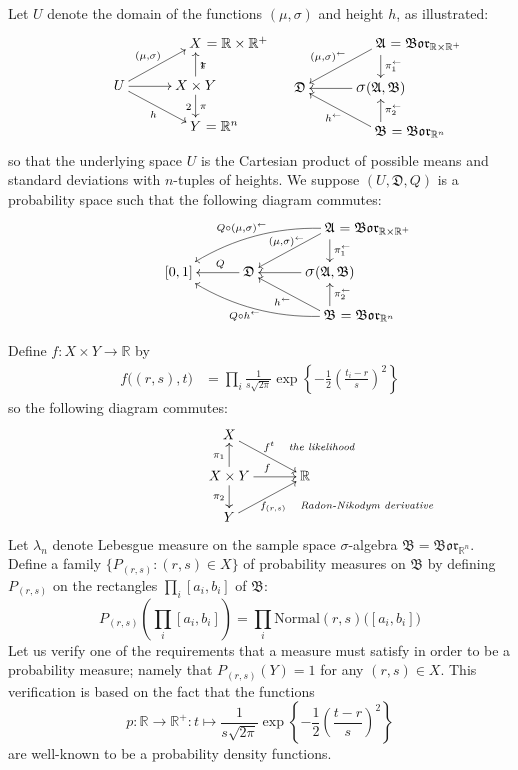\documentclass[
twoside=true,
paper=letter,
fontsize=9pt,
pagesize=auto,
leqno,
openany,
headsepline,
overfullrule,
]{scrbook}
\theoremstyle{plain}
\theoremstyle{plain}
\theoremstyle{definition}
\theoremstyle{bfnoteitalic}
\theoremstyle{bfnoteroman}
\newcommand{\sigalg}[1]{\mathfrak{#1}}
\newcommand{\borel}{\mathfrak{Bor}}
\newcommand{\sagb}{\mathop{\hbox{\large{$\sigma$}}}\nolimits}
\newcommand{\textsigma}{\hbox{\large{$\sigma$}}\kern-1pt}
\newcommand{\preimage}[1]{\mathop{#1^{\leftarrow}}}
\newcommand{\R}{\mathbb{R}}
\newcommand{\productsig}[2]{\sagb(#1,#2)}
\newcommand{\function}{f}
\newcommand{\measurespace}{X}
\newcommand{\measurespaceii}{Y}
\newcommand{\measureiii}{\lambda}
\newcommand{\projectionone}{\pi_1}
\newcommand{\projectiontwo}{\pi_2}
\newcommand{\pspace}{\measurespace}%
\newcommand{\sspace}{\measurespaceii}%
\newcommand{\sspacesig}{\sigalg{B}}
\newcommand{\pspacesig}{\sigalg{A}}
\begin{document}
Let $U$ denote the domain of the functions $(\mu,\sigma)$ and height $h$, as illustrated:
\[
\xymatrix@R=16pt@C=30pt{ 
 & \pspace \rlap{ $=\R\times\R^+$}
 \\
 U \ar[ur]^{(\mu,\sigma)} \ar[dr]_h \ar[r] & 
 \pspace\times\sspace \ar[u]_\projectionone \ar[d]^\projectiontwo
 \\
  & \sspace\rlap{ $=\R^n$} \\
}
%
\hspace{50pt}
%
\xymatrix@R=16pt@C=30pt{ 
 & \pspacesig \rlap{ $=\borel_{\R\times\R^+}$}
 \ar[dl]_{\preimage{(\mu,\sigma)}} 
 \ar[d]^{\preimage{\projectionone}}
 \\
 \sigalg{D}  & 
 \productsig{\pspacesig}{\sspacesig} 
 \ar[l]  
 \\
  & \sspacesig \rlap{ $=\borel_{\R^n}$}
  \ar[u]_{\preimage{\projectiontwo}}
  \ar[ul]^{\preimage{h}}
  \\
}
\]
so that the underlying space  $U$ is the Cartesian product of possible means and standard deviations with $n$-tuples of heights.
We suppose $(U,\sigalg{D},Q)$ is a probability space such that the following diagram commutes:
\[
\xymatrix@R=16pt@C=30pt{ 
 & & \pspacesig \rlap{ $=\borel_{\R\times\R^+}$}
 \ar[dl]_{\kern30pt\preimage{(\mu,\sigma)}} 
 \ar[d]^{\preimage{\projectionone}}
 \ar@/_10pt/[lld]_{Q\circ \preimage{(\mu,\sigma)}}
 \\
 [0,1] & \sigalg{D} \ar[l]_-{\ Q} & 
 \productsig{\pspacesig}{\sspacesig} 
 \ar[l]  
 \\
 & & \sspacesig \rlap{ $=\borel_{\R^n}$}
  \ar[u]_{\preimage{\projectiontwo}}
  \ar[ul]^{\preimage{h}}
  \ar@/^10pt/[llu]^{Q\circ\preimage{h}}
  \\
}
\]

Define $\function:\pspace \times \sspace \to\R$ by
\begin{align*}
\function\bigl((r,s),t\bigr)
& =
\prod_i
\frac{1}{s\sqrt{2\pi}}
\exp
\left\{
-\frac{1}{2}
\left(
\frac{t_i-r}{s}
\right)^2
\right\}
\end{align*}
so the following diagram commutes:
\[
\xymatrix@R=16pt@C=30pt{ 
\pspace \ar[dr]^{\function^t\quad \rlap{\emph{\scriptsize the likelihood}}}
& \\
\pspace\times\sspace 
\ar[u]^{\projectionone}
\ar[d]_{\projectiontwo}
\ar[r]^{\function}
& \R \\
\sspace 
\ar[ur]_{\function_{(r,s)} \quad \rlap{\emph{\scriptsize Radon-Nikodym derivative}}} 
& 
}
\]
Let $\measureiii_n$ denote Lebesgue measure on the sample space \textsigma-algebra 
$\sspacesig=\borel_{\R^n}$.
Define a family $\{P_{(r,s)} : (r,s) \in \pspace \}$ of probability measures on $\sspacesig$ by defining
$P_{(r,s)}$ on the
rectangles $\prod_i[a_i,b_i]$ of $\sspacesig$:
\[
P_{(r,s)}\left(\prod_i[a_i,b_i]\right) =
\prod_i\text{Normal}(r,s)\bigl([a_i,b_i]\bigr)
\]
Let us verify one of the requirements that a measure must satisfy in order to be a probability measure; namely that
$P_{(r,s)}(\sspace)=1$ for any $(r,s)\in\pspace$.
This verification is based on the fact that the functions
\[
p:\R\to\R^+
:t \mapsto
\frac{1}{s\sqrt{2\pi}}
\exp
\left\{
-\frac{1}{2}
\left(
\frac{t-r}{s}
\right)^2
\right\}
\]
are well-known to be a probability density functions.
\end{document}
